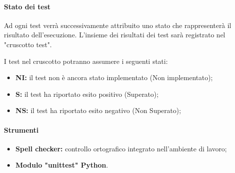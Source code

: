 \paragraph{Stato dei test}
Ad ogni test verrà successivamente attribuito uno stato che rappresenterà il risultato dell'esecuzione. L'insieme dei risultati dei test sarà registrato nel "cruscotto test".

I test nel cruscotto potranno assumere i seguenti stati: 

\begin{itemize}
    \item \textbf{NI:} 
        il test non è ancora stato implementato (Non implementato); 
    \item \textbf{S:} 
        il test ha riportato esito positivo (Superato); 
    \item \textbf{NS:}
        il test ha riportato esito negativo (Non Superato); 
\end{itemize}

\paragraph{Strumenti}
\begin{itemize}
    \item \textbf{Spell checker:} 
        controllo ortografico integrato nell’ambiente di lavoro; 
    \item \textbf{Modulo "unittest" Python}.
\end{itemize}
